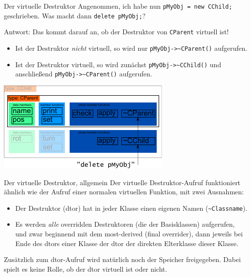 \begin{frame}[fragile,b]{Der virtuelle Destruktor}
	Angenommen, ich habe nun \verb|pMyObj = new CChild;| geschrieben. Was macht dann \verb|delete pMyObj;|?
	
	\pause
	\vspace{1em}
	
	Antwort: Das kommt darauf an, ob der Destruktor von \verb|CParent| virtuell ist!
	\begin{itemize}
		\item Ist der Destruktor \emph{nicht} virtuell, so wird nur \verb|pMyObj->~CParent()| aufgerufen.
		\item Ist der Destruktor virtuell, so wird zunächst \verb|pMyObj->~CChild()| und anschließend \verb|pMyObj->~CParent()| aufgerufen.
	\end{itemize}
	
	\includegraphics[width=0.5\linewidth]{images/pMySubObj-dtor}
\end{frame}

\begin{frame}[fragile]{Der virtuelle Destruktor, allgemein}
	Der virtuelle Destruktor-Aufruf funktioniert ähnlich wie der Aufruf einer normalen virtuellen Funktion, mit zwei Ausnahmen:
	
	\begin{itemize}
		\item Der Destruktor (dtor) hat in jeder Klasse einen eigenen Namen (\verb|~Classname|).
		\item Es werden \emph{alle} overridden Destruktoren (die der Basisklassen) aufgerufen, und zwar beginnend mit dem most-derived (final overrider), dann jeweils bei Ende des dtors einer Klasse der dtor der direkten Elterklasse dieser Klasse.
	\end{itemize}
	
	\pause
	\vspace{1em}
	
	Zusätzlich zum dtor-Aufruf wird natürlich noch der Speicher freigegeben. Dabei spielt es keine Rolle, ob der dtor virtuell ist oder nicht.
\end{frame}

